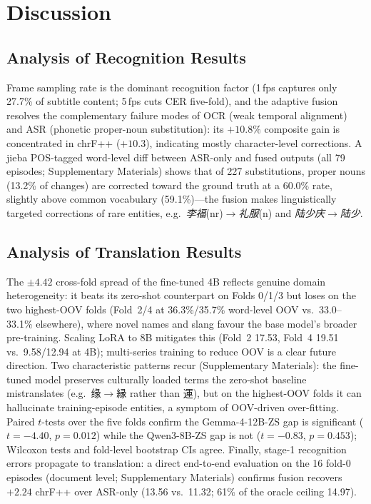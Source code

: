 \documentclass[mathematics,article,submit,xetex,moreauthors]{Definitions/mdpi}
\begin{document}
\section{Discussion}
\label{sec:discussion}

\subsection{Analysis of Recognition Results}
Frame sampling rate is the dominant recognition factor (1\,fps captures only 27.7\% of subtitle content; 5\,fps cuts CER five-fold), and the adaptive fusion resolves the complementary failure modes of OCR (weak temporal alignment) and ASR (phonetic proper-noun substitution): its $+10.8\%$ composite gain is concentrated in chrF++ ($+10.3$), indicating mostly character-level corrections.
A jieba POS-tagged word-level diff between ASR-only and fused outputs (all 79 episodes; Supplementary Materials) shows that of 227 substitutions, proper nouns (13.2\% of changes) are corrected toward the ground truth at a 60.0\% rate, slightly above common vocabulary (59.1\%)---the fusion makes linguistically targeted corrections of rare entities, e.g.\ \emph{李福}(nr)$\to$\emph{礼服}(n) and \emph{陆少庆}$\to$\emph{陆少}.

\subsection{Analysis of Translation Results}
\label{sec:discussion_translation}
The $\pm4.42$ cross-fold spread of the fine-tuned 4B reflects genuine domain heterogeneity: it beats its zero-shot counterpart on Folds 0/1/3 but loses on the two highest-OOV folds (Fold~2/4 at 36.3\%/35.7\% word-level OOV vs.\ 33.0--33.1\% elsewhere), where novel names and slang favour the base model's broader pre-training.
Scaling LoRA to 8B mitigates this (Fold~2 17.53, Fold~4 19.51 vs.\ 9.58/12.94 at 4B); multi-series training to reduce OOV is a clear future direction.
Two characteristic patterns recur (Supplementary Materials): the fine-tuned model preserves culturally loaded terms the zero-shot baseline mistranslates (e.g.\ 缘$\to$縁 rather than 運), but on the highest-OOV folds it can hallucinate training-episode entities, a symptom of OOV-driven over-fitting.
Paired $t$-tests over the five folds confirm the Gemma-4-12B-ZS gap is significant ($t=-4.40$, $p=0.012$) while the Qwen3-8B-ZS gap is not ($t=-0.83$, $p=0.453$); Wilcoxon tests and fold-level bootstrap CIs agree.
Finally, stage-1 recognition errors propagate to translation: a direct end-to-end evaluation on the 16 fold-0 episodes (document level; Supplementary Materials) confirms fusion recovers $+2.24$ chrF++ over ASR-only (13.56 vs.\ 11.32; 61\% of the oracle ceiling 14.97).
\end{document}
